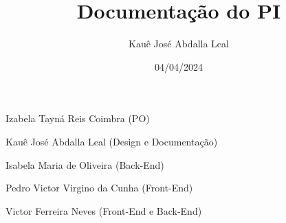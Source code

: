 \documentclass{article}
\begin{document}
\title{Documentação do PI}
\author{Kauê José Abdalla Leal}
\date{04/04/2024}

\maketitle

\begin{center}
      Izabela Tayná Reis Coimbra (PO)

      Kauê José Abdalla Leal (Design e Documentação)

      Isabela Maria de Oliveira (Back-End)

      Pedro Victor Virgino da Cunha (Front-End)

      Victor Ferreira Neves (Front-End e Back-End)
\end{center}
\end{document}
